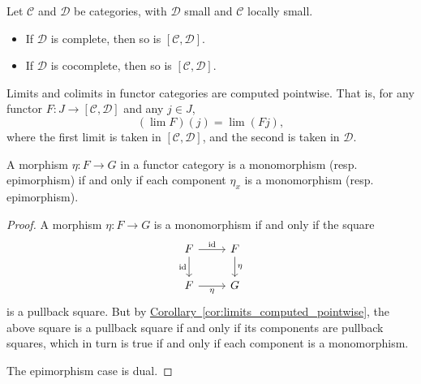 \documentclass[main.tex]{subfiles}
\begin{document}
\begin{theorem}
  \label{thm:functor_categories_complete_cocomplete}
  Let $\mathcal{C}$ and $\mathcal{D}$ be categories, with $\mathcal{D}$ small and $\mathcal{C}$ locally small.
  \begin{itemize}
    \item If $\mathcal{D}$ is complete, then so is $[\mathcal{C}, \mathcal{D}]$.

    \item If $\mathcal{D}$ is cocomplete, then so is $[\mathcal{C}, \mathcal{D}]$.
  \end{itemize}
\end{theorem}

\begin{corollary}
  \label{cor:limits_computed_pointwise}
  Limits and colimits in functor categories are computed pointwise. That is, for any functor $F\colon J \to [\mathcal{C}, \mathcal{D}]$ and any $j \in J$,
  \begin{equation*}
    (\lim F)(j) = \lim (Fj),
  \end{equation*}
  where the first limit is taken in $[\mathcal{C}, \mathcal{D}]$, and the second is taken in $\mathcal{D}$.
\end{corollary}

\begin{corollary}
  \label{cor:monos_epis_in_functor_category_preserved_pointwise}
  A morphism $\eta\colon F \to G$ in a functor category is a monomorphism (resp. epimorphism) if and only if each component $\eta_{x}$ is a monomorphism (resp. epimorphism).
\end{corollary}
\begin{proof}
  A morphism $\eta\colon F \to G$ is a monomorphism if and only if the square
  \begin{equation*}
    \begin{tikzcd}
      F
      \arrow[r, "\id"]
      \arrow[d, swap, "\id"]
      & F
      \arrow[d, "\eta"]
      \\
      F
      \arrow[r, swap, "\eta"]
      & G
    \end{tikzcd}
  \end{equation*}
  is a pullback square. But by \hyperref[cor:limits_computed_pointwise]{Corollary~\ref*{cor:limits_computed_pointwise}}, the above square is a pullback square if and only if its components are pullback squares, which in turn is true if and only if each component is a monomorphism.

  The epimorphism case is dual.
\end{proof}
\end{document}
